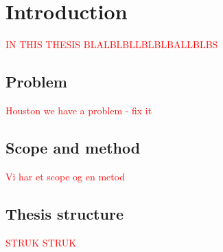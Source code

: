 \chapter{Introduction}
\textcolor{red}{IN THIS THESIS BLALBLBLLBLBLBALLBLBS}
\section{Problem}
\textcolor{red}{Houston we have a problem - fix it}
\section{Scope and method}
\textcolor{red}{Vi har et scope og en metod}
\section{Thesis structure}
\textcolor{red}{STRUK STRUK}


